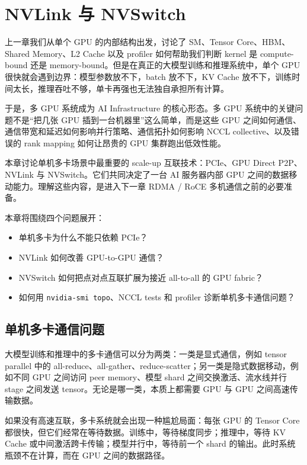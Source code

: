 \chapter{NVLink 与 NVSwitch}
\label{chap:nvlink-nvswitch}

上一章我们从单个 GPU 的内部结构出发，讨论了 SM、Tensor Core、HBM、Shared Memory、L2 Cache 以及 profiler 如何帮助我们判断 kernel 是 compute-bound 还是 memory-bound。但是在真正的大模型训练和推理系统中，单个 GPU 很快就会遇到边界：模型参数放不下，batch 放不下，KV Cache 放不下，训练时间太长，推理吞吐不够，单卡再强也无法独自承担所有计算。

于是，多 GPU 系统成为 AI Infrastructure 的核心形态。多 GPU 系统中的关键问题不是“把几张 GPU 插到一台机器里”这么简单，而是这些 GPU 之间如何通信、通信带宽和延迟如何影响并行策略、通信拓扑如何影响 NCCL collective、以及错误的 rank mapping 如何让昂贵的 GPU 集群跑出低效性能。

本章讨论单机多卡场景中最重要的 scale-up 互联技术：PCIe、GPU Direct P2P、NVLink 与 NVSwitch。它们共同决定了一台 AI 服务器内部 GPU 之间的数据移动能力。理解这些内容，是进入下一章 RDMA / RoCE 多机通信之前的必要准备。

本章将围绕四个问题展开：

\begin{itemize}
  \item 单机多卡为什么不能只依赖 PCIe？
  \item NVLink 如何改善 GPU-to-GPU 通信？
  \item NVSwitch 如何把点对点互联扩展为接近 all-to-all 的 GPU fabric？
  \item 如何用 \texttt{nvidia-smi topo}、NCCL tests 和 profiler 诊断单机多卡通信问题？
\end{itemize}

\section{单机多卡通信问题}
\label{sec:single-node-multi-gpu}

大模型训练和推理中的多卡通信可以分为两类：一类是显式通信，例如 tensor parallel 中的 all-reduce、all-gather、reduce-scatter；另一类是隐式数据移动，例如不同 GPU 之间访问 peer memory、模型 shard 之间交换激活、流水线并行 stage 之间发送 tensor。无论是哪一类，本质上都需要 GPU 与 GPU 之间高速传输数据。

如果没有高速互联，多卡系统就会出现一种尴尬局面：每张 GPU 的 Tensor Core 都很快，但它们经常在等待数据。训练中，等待梯度同步；推理中，等待 KV Cache 或中间激活跨卡传输；模型并行中，等待前一个 shard 的输出。此时系统瓶颈不在计算，而在 GPU 之间的数据路径。

